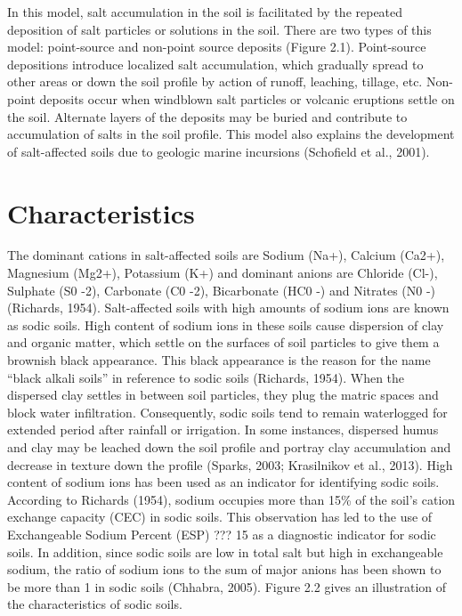 \documentclass[
  10pt,
  b5paper,
]{book}
\begin{document}
In this model, salt accumulation in the soil is facilitated by the repeated deposition of salt particles or solutions in the soil. There are two types of this model: point-source and non-point source deposits (Figure 2.1). Point-source depositions introduce localized salt accumulation, which gradually spread to other areas or down the soil profile by action of runoff, leaching, tillage, etc. Non-point deposits occur when windblown salt particles or volcanic eruptions settle on the soil. Alternate layers of the deposits may be buried and contribute to accumulation of salts in the soil profile. This model also explains the development of salt-affected soils due to geologic marine incursions (Schofield et al., 2001).

\hypertarget{characteristics}{%
\section{Characteristics}\label{characteristics}}

The dominant cations in salt-affected soils are Sodium (Na+), Calcium (Ca2+), Magnesium (Mg2+), Potassium (K+) and dominant anions are Chloride (Cl-), Sulphate (S0 -2), Carbonate (C0 -2), Bicarbonate (HC0 -) and Nitrates (N0 -) (Richards, 1954). Salt-affected soils with high amounts of sodium ions are known as sodic soils. High content of sodium ions in these soils cause dispersion of clay and organic matter, which settle on the surfaces of soil particles to give them a brownish black appearance. This black appearance is the reason for the name ``black alkali soils'' in reference to sodic soils (Richards, 1954). When the dispersed clay settles in between soil particles, they plug the matric spaces and block water infiltration. Consequently, sodic soils tend to remain waterlogged for extended period after rainfall or irrigation. In some instances, dispersed humus and clay may be leached down the soil profile and portray clay accumulation and decrease in texture down the profile (Sparks, 2003; Krasilnikov et al., 2013).
High content of sodium ions has been used as an indicator for identifying sodic soils. According to Richards (1954), sodium occupies more than 15\% of the soil's cation exchange capacity (CEC) in sodic soils. This observation has led to the use of Exchangeable Sodium Percent (ESP) ??? 15 as a diagnostic indicator for sodic soils. In addition, since sodic soils are low in total salt but high in exchangeable sodium, the ratio of sodium ions to the sum of major anions has been shown to be more than 1 in sodic soils (Chhabra, 2005). Figure 2.2 gives an illustration of the characteristics of sodic soils.
\end{document}
